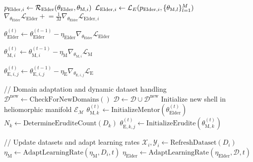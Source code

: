 \begin{algorithm}
\begin{algorithmic}[1]
        \State $p_{\text{Elder},i} \gets \mathcal{R}_{\text{Elder}}(\theta_{\text{Elder}}, \theta_{\text{M},i})$ 
        \State $\mathcal{L}_{\text{Elder},i} \gets \mathcal{L}_E(p_{\text{Elder},i}, \{\theta_{\text{M},l}\}_{l=1}^{M})$ 
        \State $\nabla_{\theta_{\text{Elder}}} \mathcal{L}_{\text{Elder}} \mathrel{+}= \frac{1}{M} \nabla_{\theta_{\text{Elder}}} \mathcal{L}_{\text{Elder},i}$ 
    \EndFor
    
    \State $\theta_{\text{Elder}}^{(t)} \gets \theta_{\text{Elder}}^{(t-1)} - \eta_{\text{Elder}} \nabla_{\theta_{\text{Elder}}} \mathcal{L}_{\text{Elder}}$ 
    
        \State $\theta_{\text{M},i}^{(t)} \gets \theta_{\text{M},i}^{(t-1)} - \eta_{\text{M}} \nabla_{\theta_{\text{M},i}} \mathcal{L}_{\text{M}}$ 
        
            \State $\theta_{\text{E},i,j}^{(t)} \gets \theta_{\text{E},i,j}^{(t-1)} - \eta_{\text{E}} \nabla_{\theta_{\text{E},i,j}} \mathcal{L}_{\text{E}}$ 
        \EndFor
    \EndFor
    
    \State // Domain adaptation and dynamic dataset handling
    \State $\mathcal{D}^{\text{new}} \gets \text{CheckForNewDomains}()$ 
        \State $\mathcal{D} \gets \mathcal{D} \cup \mathcal{D}^{\text{new}}$ 
            \State Initialize new shell in heliomorphic manifold $\mathcal{E}_{\mathcal{M}}$
            \State $\theta_{\text{M},k}^{(t)} \gets \text{InitializeMentor}(\theta_{\text{Elder}}^{(t)})$ 
            \State $N_k \gets \text{DetermineEruditeCount}(D_k)$
                \State $\theta_{\text{E},k,j}^{(t)} \gets \text{InitializeErudite}(\theta_{\text{M},k}^{(t)})$ 
            \EndFor
        \EndFor
    \EndIf
    
    \State // Update datasets and adapt learning rates
        \State $\mathcal{X}_i, \mathcal{Y}_i \gets \text{RefreshDataset}(D_i)$ 
        \State $\eta_{\text{M}} \gets \text{AdaptLearningRate}(\eta_{\text{M}}, D_i, t)$
    \EndFor
    \State $\eta_{\text{Elder}} \gets \text{AdaptLearningRate}(\eta_{\text{Elder}}, \mathcal{D}, t)$
    

\end{algorithmic}
\end{algorithm}
